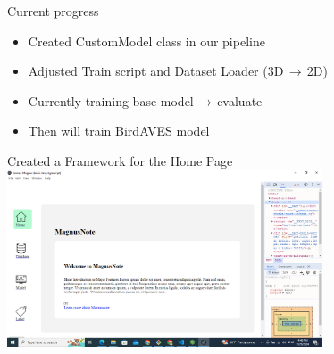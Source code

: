 \begin{frame}{Current progress}
    \begin{itemize}
        \item Created CustomModel class in our pipeline
        \item Adjusted Train script and Dataset Loader (3D$ \,\to\, $2D)
        \item Currently training base model$ \,\to\, $evaluate
        \item Then will train BirdAVES model
    \end{itemize}
\end{frame}


\begin{frame}{Created a Framework for the Home Page}
    \centering
    \includegraphics[height=0.7\textheight,width=0.7\textwidth,keepaspectratio]{homepage.png}  
\end{frame}


